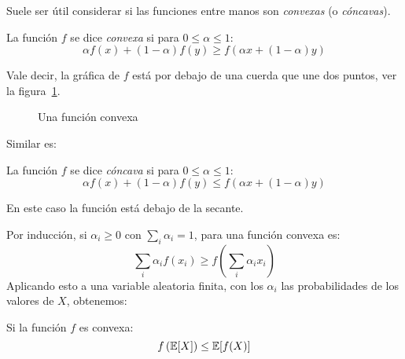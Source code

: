   Suele ser útil considerar si las funciones entre manos
  son \emph{convexas}
  (o \emph{cóncavas}).
  \begin{definition}
    La función \(f\) se dice \emph{convexa}
    si para \(0 \le \alpha \le 1\):
    \begin{equation*}
      \alpha f(x) + (1 - \alpha) f(y)
        \ge f(\alpha x + (1 - \alpha) y)
    \end{equation*}
  \end{definition}
  Vale decir,
  la gráfica de \(f\) está por debajo de una cuerda que une dos puntos,
  ver la figura~\ref{fig:convexitud}.
  \begin{figure}[ht]
    \centering
    \caption{Una función convexa}
    \label{fig:convexitud}
  \end{figure}
  Similar es:
  \begin{definition}
    La función \(f\) se dice \emph{cóncava}
    si para \(0 \le \alpha \le 1\):
    \begin{equation*}
      \alpha f(x) + (1 - \alpha) f(y)
        \le f(\alpha x + (1 - \alpha) y)
    \end{equation*}
  \end{definition}
  En este caso la función está debajo de la secante.

  Por inducción,
  si \(\alpha_i \ge 0\) con \(\sum_i \alpha_i = 1\),
  para una función convexa es:
  \begin{equation*}
    \sum_i \alpha_i f(x_i)
      \ge f\left( \sum_i \alpha_i x_i \right)
  \end{equation*}
  Aplicando esto a una variable aleatoria finita,
  con los \(\alpha_i\) las probabilidades de los valores de \(X\),
  obtenemos:
  \begin{theorem}
    Si la función \(f\) es convexa:
    \begin{equation}
      \label{eq:Jensen}
      f\left( \operatorname{\mathbb{E}}[X] \right)
        \le \operatorname{\mathbb{E}}[f(X)]
    \end{equation}
  \end{theorem}

